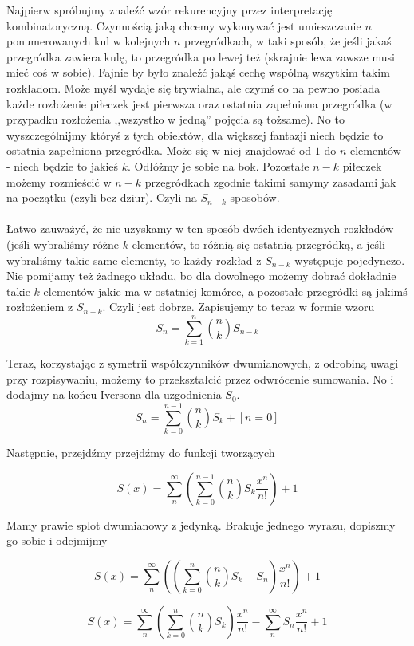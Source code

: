 \documentclass[a4paper,11pt]{article}
\begin{document}
\small Najpierw spróbujmy znaleźć wzór rekurencyjny przez interpretację kombinatoryczną. Czynnością jaką chcemy wykonywać jest umieszczanie $n$ ponumerowanych kul w kolejnych $n$ przegródkach, w taki sposób, że jeśli jakaś przegródka zawiera kulę, to przegródka po lewej też (skrajnie lewa zawsze musi mieć coś w sobie). Fajnie by było znaleźć jakąś cechę wspólną wszytkim takim rozkładom. Może myśl wydaje się trywialna, ale czymś co na pewno posiada każde rozłożenie piłeczek jest pierwsza oraz ostatnia zapełniona przegródka (w przypadku rozłożenia ,,wszystko w jedną'' pojęcia są tożsame). No to wyszczególnijmy któryś z tych obiektów, dla większej fantazji niech będzie to ostatnia zapełniona przegródka. Może się w niej znajdować od $1$ do $n$ elementów - niech będzie to jakieś $k$. Odłóżmy je sobie na bok. Pozostałe $n-k$ piłeczek możemy rozmieścić w $n-k$ przegródkach zgodnie takimi samymy zasadami jak na początku (czyli bez dziur). Czyli na $S_{n-k}$ sposobów. \\ \\

Łatwo zauważyć, że nie uzyskamy w ten sposób dwóch identycznych rozkładów (jeśli wybraliśmy różne $k$ elementów, to różnią się ostatnią przegródką, a jeśli wybraliśmy takie same elementy, to każdy rozkład z $S_{n-k}$ występuje pojedynczo. Nie pomijamy też żadnego układu, bo dla dowolnego możemy dobrać dokładnie takie $k$ elementów jakie ma w ostatniej komórce, a pozostałe przegródki są jakimś rozłożeniem z $S_{n-k}$. Czyli jest dobrze. Zapisujemy to teraz w formie wzoru
\[
  S_{n} = \sum_{k=1}^{n} {n \choose k} S_{n-k}
\]

Teraz, korzystając z symetrii współczynników dwumianowych, z odrobiną uwagi przy rozpisywaniu, możemy to przekształcić przez odwrócenie sumowania. No i dodajmy na końcu Iversona dla uzgodnienia $S_{0}$.
\[
  S_{n} = \sum_{k=0}^{n-1} {n \choose k} S_{k} + [n=0]
\]

Następnie, przejdźmy przejdźmy do funkcji tworzących

\[
  S(x) = \sum_{n}^{\infty}\left( \sum_{k=0}^{n-1} {n \choose k} S_{k} \frac{x^{n}}{n!}\right) + 1
\]

Mamy prawie splot dwumianowy z jedynką. Brakuje jednego wyrazu, dopiszmy go sobie i odejmijmy

\[
  S(x) = \sum_{n}^{\infty}\left( \left( \sum_{k=0}^{n} {n \choose k} S_{k} - S_{n} \right) \frac{x^{n}}{n!}\right) + 1
\]

\[
  S(x) = \sum_{n}^{\infty}\left( \sum_{k=0}^{n} {n \choose k} S_{k} \right) \frac{x^{n}}{n!} - \sum_{n}^{\infty} S_{n} \frac{x^{n}}{n!} + 1
\]
\end{document}
